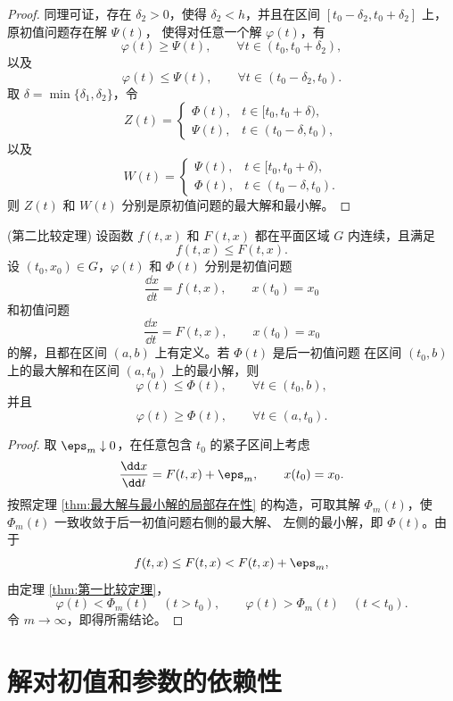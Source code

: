 \begin{proof}
	同理可证，存在 $\delta_2>0$，使得 $\delta_2<h$，并且在区间
	$[t_0-\delta_2,t_0+\delta_2]$ 上，原初值问题存在解 $\Psi(t)$，
	使得对任意一个解 $\varphi(t)$，有
	\[
		\varphi(t)\geq\Psi(t),
		\qquad \forall t\in(t_0,t_0+\delta_2),
	\]
	以及
	\[
		\varphi(t)\leq\Psi(t),
		\qquad \forall t\in(t_0-\delta_2,t_0).
	\]
	取 $\delta=\min\{\delta_1,\delta_2\}$，令
	\[
		Z(t)=
		\begin{cases}
			\Phi(t), & t\in[t_0,t_0+\delta),\\
			\Psi(t), & t\in(t_0-\delta,t_0),
		\end{cases}
	\]
	以及
	\[
		W(t)=
		\begin{cases}
			\Psi(t), & t\in[t_0,t_0+\delta),\\
			\Phi(t), & t\in(t_0-\delta,t_0).
		\end{cases}
	\]
	则 $Z(t)$ 和 $W(t)$ 分别是原初值问题的最大解和最小解。
\end{proof}

\begin{theorem}(第二比较定理)\label{thm:第二比较定理}
	设函数 $f(t,x)$ 和 $F(t,x)$ 都在平面区域 $G$ 内连续，且满足
	\[
		f(t,x)\leq F(t,x).
	\]
	设 $(t_0,x_0)\in G$，$\varphi(t)$ 和 $\Phi(t)$ 分别是初值问题
	\[
		\dfrac{\dd x}{\dd t}=f(t,x),
		\qquad x(t_0)=x_0
	\]
	和初值问题
	\[
		\dfrac{\dd x}{\dd t}=F(t,x),
		\qquad x(t_0)=x_0
	\]
	的解，且都在区间 $(a,b)$ 上有定义。若 $\Phi(t)$ 是后一初值问题
	在区间 $(t_0,b)$ 上的最大解和在区间 $(a,t_0)$ 上的最小解，则
	\[
		\varphi(t)\leq\Phi(t),
		\qquad \forall t\in(t_0,b),
	\]
	并且
	\[
		\varphi(t)\geq\Phi(t),
		\qquad \forall t\in(a,t_0).
	\]
\end{theorem}

\begin{proof}
	取 $\eps_m\downarrow0$，在任意包含 $t_0$ 的紧子区间上考虑
	\[
		\dfrac{\dd x}{\dd t}=F(t,x)+\eps_m,
		\qquad x(t_0)=x_0.
	\]
	按照定理 \ref{thm:最大解与最小解的局部存在性} 的构造，可取其解
	$\Phi_m(t)$，使 $\Phi_m(t)$ 一致收敛于后一初值问题右侧的最大解、
	左侧的最小解，即 $\Phi(t)$。由于
	\[
		f(t,x)\leq F(t,x)<F(t,x)+\eps_m,
	\]
	由定理 \ref{thm:第一比较定理}，
	\[
		\varphi(t)<\Phi_m(t)\quad(t>t_0),
		\qquad
		\varphi(t)>\Phi_m(t)\quad(t<t_0).
	\]
	令 $m\to\infty$，即得所需结论。
\end{proof}
\section{解对初值和参数的依赖性}\label{sec:解对初值和参数的依赖性}


